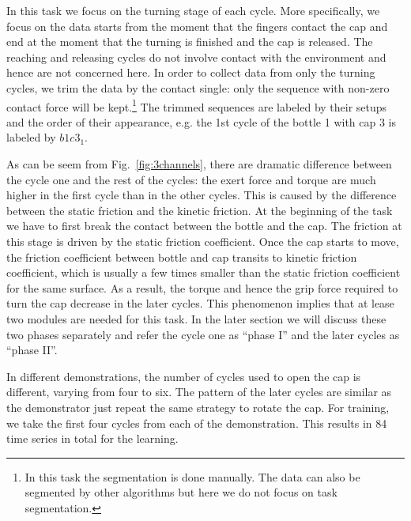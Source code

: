 \documentclass[preprint,12pt]{elsarticle}
\begin{document}
In this task we focus on the turning stage of each cycle. More specifically, we focus on the data starts from the moment that the fingers contact the cap and end at the moment that the turning is finished and the cap is released. The reaching and releasing cycles do not involve contact with the environment and hence are not concerned here.
In order to collect data from only the turning cycles, we trim the data by the contact single: only the sequence with non-zero contact force will be kept.\footnote{In this task the segmentation is done manually. The data can also be segmented by other algorithms but here we do not focus on task segmentation.} The trimmed sequences are labeled by their setups and the order of their appearance, e.g. the 1st cycle of the bottle 1 with cap 3 is labeled by $b1c3_1$.

As can be seem from Fig.~\ref{fig:3channels}, there are dramatic difference between the cycle one and the rest of the cycles: the exert force and torque are much higher in the first cycle than in the other cycles. This is caused by the difference between the static friction and the kinetic friction. At the beginning of the task we have to first break the contact between the bottle and the cap. The friction at this stage is driven by the static friction coefficient. Once the cap starts to move, the friction coefficient between bottle and cap transits to kinetic friction coefficient, which is usually a few times smaller than the static friction coefficient for the same surface. As a result, the torque and hence the grip force required to turn the cap decrease in the later cycles. This phenomenon implies that at lease two modules are needed for this task. In the later section we will discuss these two phases separately and refer the cycle one as ``phase I'' and the later cycles as ``phase II''.

In different demonstrations, the number of cycles used to open the cap is different, varying from four to six. The pattern of the later cycles  are similar as the demonstrator just repeat the same strategy to rotate the cap. For training, we take the first four cycles from each of the demonstration. This results in 84 time series in total for the learning.
\end{document}
